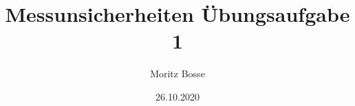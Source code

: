 

\author{Moritz Bosse}
\title{Messunsicherheiten Übungsaufgabe 1}
\date{26.10.2020}



\begin{minipage}{\textwidth}
\maketitle
\tableofcontents
\end{minipage}
\ignorespacesafterend
\newpage






